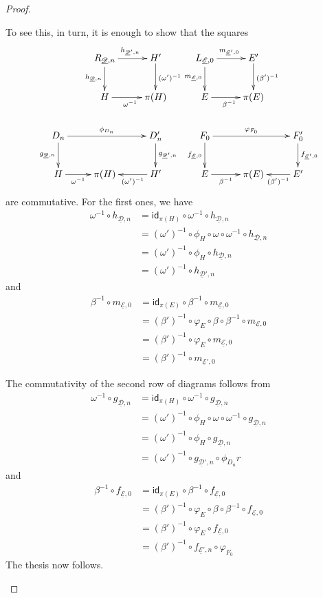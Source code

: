 \documentclass[a4paper]{article}
\newcommand{\id}[1]{\mathsf{id}_{#1}}
\def\D{\textbf {\textup{D}}}
\newcommand{\dder}[1]{\mathscr{#1}}
\newcommand{\der}[1]{\underline{\dder{#1}}}
\theoremstyle{definition}
\begin{document}
\begin{proof}
\begin{itemize}
To see this, in turn, it is enough to show that	the squares
\[\xymatrix{&R_{\der{D}, n} \ar[d]_{h_{\der{D}, n}}\ar[r]^{h_{\der{D}', n}} & H' \ar[d]^{(\omega')^{-1}} &L_{\der{E}, 0} \ar[d]_{m_{\der{E}, 0}}\ar[r]^{m_{\der{E}', 0}}& E' \ar[d]^{(\beta')^{-1}}\\&H\ar[r]_{\omega^{-1}} &\pi(H)&E \ar[r]_{\beta^{-1}} & \pi(E)\\D_n \ar[rr]^{\phi_{D_n}} \ar[d]_{g_{\der{D}, n}}&&D'_n \ar[d]^{g_{\der{D}', n}}&F_0 \ar[d]_{f_{\der{E}, 0}} \ar[rr]^{\varphi_{F_0}} && F_0' \ar[d]^{f_{\der{E}', 0}}\\H \ar[r]_-{\omega^{-1}} &\pi(H)&H' \ar[l]^-{(\omega')^{-1}}  &E \ar[r]_-{\beta^{-1}} & \pi(E) & E' \ar[l]^-{(\beta')^{-1}}}\]
are commutative. For the first ones, we have
	\begin{align*} 
	\omega^{-1} \circ h_{\der{D}, n}&=\id{\pi(H)}\circ \omega^{-1} \circ h_{\der{D}, n} \\&=(\omega')^{-1}\circ \phi_H \circ \omega \circ \omega^{-1} \circ h_{\der{D}, n}\\&=(\omega')^{-1}\circ \phi_H  \circ h_{\der{D}, n}\\&=(\omega')^{-1}  \circ h_{\der{D}', n}
\end{align*} 
and
\begin{align*} 
	\beta^{-1} \circ m_{\der{E}, 0}&=\id{\pi(E)}\circ \beta^{-1} \circ m_{\der{E}, 0}\\&=(\beta')^{-1}\circ \varphi_{E} \circ \beta \circ \beta^{-1} \circ m_{\der{E}, 0}\\&=(\beta')^{-1}\circ \varphi_{E}  \circ m_{\der{E}, 0}\\&=(\beta')^{-1}  \circ m_{\der{E}', 0}
\end{align*} 

The commutativity of the second row of diagrams follows from
\begin{align*}
 \omega^{-1} \circ g_{\der{D}, n}&=\id{\pi(H)}\circ \omega^{-1} \circ g_{\der{D}, n}\\&=(\omega')^{-1}\circ \phi_H \circ \omega\circ \omega^{-1} \circ g_{\der{D}, n}\\&=(\omega')^{-1}\circ \phi_H  \circ g_{\der{D}, n}\\&= (\omega')^{-1} \circ g_{\der{D}', n}\circ \phi_{D_n}
r\end{align*}
and
\begin{align*}
	\beta^{-1} \circ f_{\der{E}, 0}&=\id{\pi(E)}\circ \beta^{-1} \circ f_{\der{E}, 0}\\&=(\beta')^{-1}\circ \varphi_E \circ \beta\circ \beta^{-1} \circ f_{\der{E}, 0}\\&=(\beta')^{-1}\circ \varphi_E  \circ f_{\der{E}, 0}\\&= (\beta')^{-1} \circ f_{\der{E}', n}\circ \varphi_{F_0}
\end{align*}
 The thesis now follows.	\qedhere 
\end{itemize}	
\end{proof}
\end{document}
